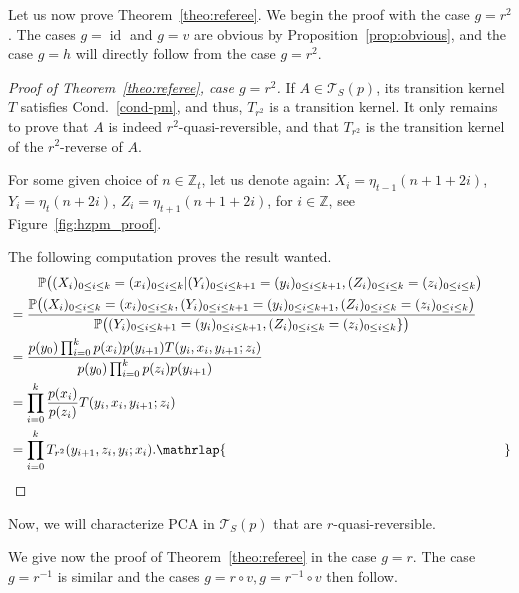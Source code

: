 \documentclass[AHL,Unicode,longabstracts]{cedram}
\newcounter{a}
\newcommand{\Cond}{Cond.}
\newcommand{\triang}[2]{\mathcal{T}_{#1} \left(#2 \right)}
\newcommand{\triangE}[1]{\mathcal{T}_{#1}}
\DeclareMathOperator{\id}{id}
\newcommand{\Z}{\mathbb{Z}}
\newcommand{\Pbb}{\mathbb{P}}
\begin{document}
Let us now prove Theorem~\ref{theo:referee}. We begin the proof with the case $g=r^2$. The cases $g=\id$ and $g=v$ are obvious by Proposition~\ref{prop:obvious}, and the case $g=h$ will directly follow from the case $g=r^2$.



\begin{proof}[Proof of Theorem~\ref{theo:referee}, case $g=r^2$]
If $A\in\triang{S}{p}$, its transition kernel $T$ satisfies \Cond~\ref{cond-pm}, and thus, $T_{r^2}$ is a transition kernel. It only remains to prove that $A$ is indeed $r^{2}$-quasi-reversible, and that $T_{r^2}$ is the transition kernel of the $r^2$-reverse of $A$.



For some given choice of $n\in\Z_{t}$, let us denote again: $X_i=\eta_{t-1}(n+1+2i)$,\linebreak $Y_i=\eta_{t}(n+2i)$, $Z_i=\eta_{t+1}(n+1+2i)$, for $i\in \Z$, see Figure~\ref{fig:hzpm_proof}.

The following computation proves the result wanted.
\begin{multline*}
\Pbb\big((X_i)_{0\leq i\leq k} = (x_i)_{0\leq i\leq k} |(Y_i)_{0\leq i\leq k+1} = (y_i)_{0\leq i\leq k+1}, (Z_i)_{0\leq i\leq k} = (z_i)_{0\leq i\leq k}\big)\\
\begin{aligned}
&=\frac{\Pbb\big((X_i)_{0\leq i\leq k} = (x_i)_{0\leq i\leq k},(Y_i)_{0\leq i\leq k+1} = (y_i)_{0\leq i\leq k+1}, (Z_i)_{0\leq i\leq k} = (z_i)_{0\leq i\leq k}\big)}{\Pbb\big((Y_i)_{0\leq i\leq k+1} = (y_i)_{0\leq i\leq k+1}, (Z_i)_{0\leq i\leq k} = (z_i)_{0\leq i\leq k}\}\big)}\\
&=\frac{p(y_0) \prod_{i=0}^k p(x_i)p(y_{i+1}) T(y_i,x_i,y_{i+1};z_i)}{p(y_{0}) \prod_{i=0}^k p(z_i) p(y_{i+1})}\\
&=\prod_{i=0}^k \frac{p(x_i)}{p(z_i)} T(y_i,x_i,y_{i+1};z_i)\\
&=\prod_{i=0}^k T_{r^2}(y_{i+1},z_i,y_i ; x_i). \mathrlap{\mkern 373mu\qed}
\end{aligned}
\end{multline*}
\let\qed\relax
\end{proof}

Now, we will characterize PCA in $\triangE{S}(p)$ that are $r$-quasi-reversible.

We give now the proof of Theorem~\ref{theo:referee} in the case $g=r$. The case $g=r^{-1}$ is similar and the cases $g=r\circ v, g=r^{-1}\circ v$ then follow.
\end{document}
